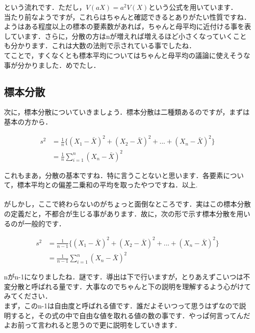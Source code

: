 \documentclass[11pt,a4paper,uplatex]{ujreport} 	%
\begin{document}
という流れです．ただし，$V(aX) = a^2 V(X)$という公式を用いています．\\



当たり前なようですが，これらはちゃんと確認できるとありがたい性質ですね．ようはある程度以上の標本の要素数があれば，ちゃんと母平均に近付ける事を表しています．さらに，分散の方はnが増えれば増えるほど小さくなっていくことも分かります．これは大数の法則で示されている事でしたね．\\

てことで，すくなくとも標本平均についてはちゃんと母平均の議論に使えそうな事が分かりました．めでたし．



\subsection{標本分散}
次に，標本分散についていきましょう．標本分散は二種類あるのですが，まずは基本の方から．

\begin{align}
  s^2 &= \frac{1}{n}\{ (X_1-\bar{X})^2 + (X_2-\bar{X})^2 + ...+(X_n - \bar{X})^2 \}\\
      &= \frac{1}{n} \sum_{i=1}^n(X_n - \bar{X})^2
      \label{eq:hyohonvar}
\end{align}

これもまあ，分散の基本ですね．特に言うことないと思います．各要素について，標本平均との偏差二乗和の平均を取ったやつですね．以上.\\
\\

がしかし，ここで終わらないのがちょっと面倒なところです．実はこの標本分散の定義だと，不都合が生じる事があります．故に，次の形で示す標本分散を用いるのが一般的です．

\begin{align}
  s^2 &= \frac{1}{n-1}\{ (X_1-\bar{X})^2 + (X_2-\bar{X})^2 + ...+(X_n - \bar{X})^2 \}\\
      &= \frac{1}{n-1} \sum_{i=1}^n(X_n - \bar{X})^2
\end{align}

nがn-1になりましたね．謎です．導出は下で行いますが，とりあえずこいつは不変分散と呼ばれる量です．大事なのでちゃんと下の説明を理解するよう心がけてみてください．\\

まず，このn-1は自由度と呼ばれる値です．誰だよそいつって思うはずなので説明すると，その式の中で自由な値を取れる値の数の事です．やっぱ何言ってんだよお前って言われると思うので更に説明をしていきます．\\
\end{document}
